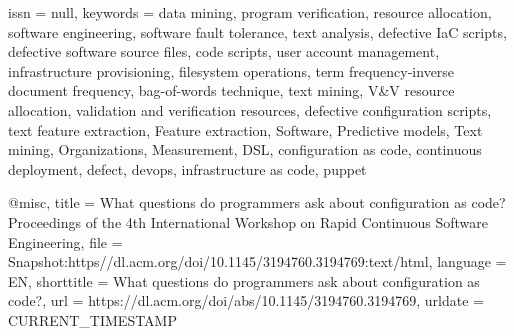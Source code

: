{{{{  issn      = {null},
  keywords  = {data mining, program verification, resource allocation, software engineering, software fault tolerance, text analysis, defective IaC scripts, defective software source files, code scripts, user account management, infrastructure provisioning, filesystem operations, term frequency-inverse document frequency, bag-of-words technique, text mining, V\&V resource allocation, validation and verification resources, defective configuration scripts, text feature extraction, Feature extraction, Software, Predictive models, Text mining, Organizations, Measurement, DSL, configuration as code, continuous deployment, defect, devops, infrastructure as code, puppet}
}

@misc{,
  title      = {What questions do programmers ask about configuration as code? {\textbar} {Proceedings} of the 4th {International} {Workshop} on {Rapid} {Continuous} {Software} {Engineering}},
  file       = {Snapshot:https\://dl.acm.org/doi/10.1145/3194760.3194769:text/html},
  language   = {EN},
  shorttitle = {What questions do programmers ask about configuration as code?},
  url        = {https://dl.acm.org/doi/abs/10.1145/3194760.3194769},
  urldate    = {CURRENT\_TIMESTAMP}
}

}}}
